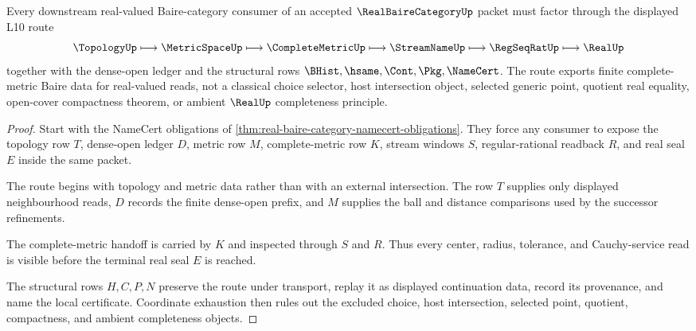 \begin{theorem}
\label{thm:real-baire-category-complete-metric-route}
Every downstream real-valued Baire-category consumer of an accepted $\RealBaireCategoryUp$ packet must factor through the displayed L10 route
$$
\TopologyUp \longmapsto \MetricSpaceUp \longmapsto \CompleteMetricUp \longmapsto \StreamNameUp \longmapsto \RegSeqRatUp \longmapsto \RealUp
$$
together with the dense-open ledger and the structural rows $\BHist,\hsame,\Cont,\Pkg,\NameCert$. The route exports finite complete-metric Baire data for real-valued reads, not a classical choice selector, host intersection object, selected generic point, quotient real equality, open-cover compactness theorem, or ambient $\RealUp$ completeness principle.
\end{theorem}
\begin{proof}
Start with the NameCert obligations of \autoref{thm:real-baire-category-namecert-obligations}. They force any consumer to expose the topology row $T$, dense-open ledger $D$, metric row $M$, complete-metric row $K$, stream windows $S$, regular-rational readback $R$, and real seal $E$ inside the same packet.

The route begins with topology and metric data rather than with an external intersection. The row $T$ supplies only displayed neighbourhood reads, $D$ records the finite dense-open prefix, and $M$ supplies the ball and distance comparisons used by the successor refinements.

The complete-metric handoff is carried by $K$ and inspected through $S$ and $R$. Thus every center, radius, tolerance, and Cauchy-service read is visible before the terminal real seal $E$ is reached.

The structural rows $H,C,P,N$ preserve the route under transport, replay it as displayed continuation data, record its provenance, and name the local certificate. Coordinate exhaustion then rules out the excluded choice, host intersection, selected point, quotient, compactness, and ambient completeness objects.
\end{proof}


